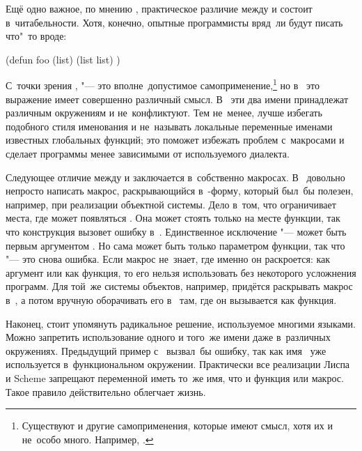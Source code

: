 Ещё одно важное, по мнению \cite{gp88}, практическое различие между  и
 состоит в~читабельности. Хотя, конечно, опытные программисты вряд~ли
будут писать что"~то вроде:

\begin{code:lisp}
(defun foo (list)
  (list list) )
\end{code:lisp}

\noindent
С~точки зрения ,  "--- это вполне~допустимое
самоприменение,\footnote*{Существуют и другие самоприменения, которые имеют
смысл, хотя их и не~особо много. Например, .} но в~
это выражение имеет совершенно различный смысл. В~{\CommonLisp} эти два имени
принадлежат различным окружениям и не~конфликтуют. Тем не~менее, лучше избегать
подобного стиля именования и не~называть локальные переменные именами известных
глобальных функций; это поможет избежать проблем с~макросами и сделает программы
менее зависимыми от используемого диалекта.

Следующее отличие между  и  заключается в~собственно макросах.
В~{\CommonLisp} довольно непросто написать макрос, раскрывающийся
в~-форму, который был~бы полезен, например, при реализации объектной
системы. Дело в~том, что {\CommonLisp} ограничивает места, где может появляться
. Она может стоять только на месте функции, так что конструкция
 вызовет ошибку в~{\CommonLisp}. Единственное
исключение "---  может быть первым аргументом . Но сама
 может быть только параметром функции, так что  "--- это снова ошибка. Если макрос не~знает, где именно он
раскроется: как аргумент или как функция, то его нельзя использовать без
некоторого усложнения программ. Для той~же системы объектов, например, придётся
раскрывать макрос в~, а потом вручную оборачивать
его в~ там, где он вызывается как функция.

Наконец, стоит упомянуть радикальное решение, используемое многими языками.
Можно запретить использование одного и того~же имени даже в~различных
окружениях. Предыдущий пример с~ вызвал~бы ошибку, так как
имя~ уже используется в~функциональном окружении. Практически все
реализации Лиспа и Scheme запрещают переменной иметь то~же имя, что и функция
или макрос. Такое правило действительно облегчает жизнь.



